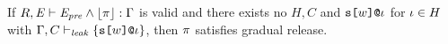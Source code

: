 \begin{theorem}
  If $R,\mathit{E} \vdash \mathit{E}_{\mathit{pre}} \wedge \lfloor \pi \rfloor : \Gamma$ is valid and there exists no $H,C$ 
  and  $\texttt{s[}w\texttt{]}\texttt{@}\iota$ for $\iota \in H$ with $\Gamma,C \vdash_{\mathit{leak}} \{ \texttt{s[}w\texttt{]}\texttt{@}\iota \}$,
  then $\pi$ satisfies gradual release.
\end{theorem}

\begin{comment}
\subsection{Examples}

\begin{verbatimtab}
m[s1]@2 := (s[1] - r[local] - r[x])@1
m[s1]@3 := r[x]@1

// m[s1]@2 : { c(r[x]@1, { c(r[local]@1, {s[1]@1} ) }
// m[s1]@3 : { r[x]@1 }
\end{verbatimtab}

\begin{verbatimtab}
m[x]@1 := s2(s[x],-r[x],r[x])@2

// m[x]@1 == s[x]@2 + -r[x]@2 
// m[x]@1 : { c(r[x]@2, { s[x]@2 }) } 

m[y]@1 := OT(s[y]@1,-r[y],r[y])@2

// m[y]@1 == s[y]@1 + -r[y]@2
// m[y]@1 : { c(r[y]@2, { s[y]@1 }) } 
\end{verbatimtab}
\end{comment}
